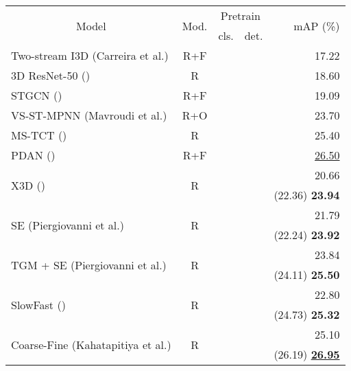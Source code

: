 \documentclass[letterpaper]{article} \usepackage{aaai23}  \usepackage{times}  \usepackage{helvet}  \usepackage{courier}  \usepackage[hyphens]{url}  \usepackage{graphicx} \urlstyle{rm} \def\UrlFont{\rm}  \usepackage{natbib}  \usepackage{caption} \frenchspacing  \setlength{\pdfpagewidth}{8.5in}  \setlength{\pdfpageheight}{11in}  \usepackage{algorithm}
\newcommand{\tablestyle}[2]{\setlength{\tabcolsep}{#1}\renewcommand{\arraystretch}{#2}\centering\footnotesize}
\begin{document}
\begin{table}[t!]
	\centering
	\tablestyle{1.8pt}{1.}
	\fontsize{9}{11}\selectfont
		\begin{tabular}{l|c|c|c|r}
			\multicolumn{1}{c|}{\multirow{2}{*}{Model}} & \multicolumn{1}{c|}{\multirow{2}{*}{Mod.}} & \multicolumn{2}{c|}{Pretrain}  & \multirow{2}{*}{mAP (\%)} \\
			{} & {} & cls. & det. & {} \\
			\shline
			{Two-stream I3D (Carreira et al.)} & {R+F} & \checkmark & {} & 17.22 \\
			3D ResNet-50 (\citeauthor{he2016deep}) & {R} & \checkmark & {} &   18.60 \\
			{STGCN (\citeauthor{ghosh2020stacked})} & {R+F} & \checkmark & {} & 19.09 \\
			{VS-ST-MPNN (Mavroudi et al.)} & {R+O} & \checkmark & {} & 23.70 \\
			{MS-TCT (\citeauthor{dai2022mstct})} & {R} & \checkmark & {} & 25.40 \\
			{PDAN (\citeauthor{dai2021pdan})} & {R+F} & \checkmark & {} & \underline{26.50} \\
			
			\hline
			\multirow{2}{*}{{X3D (\citeauthor{feichtenhofer2020x3d})}} & \multirow{2}{*}{R} & \checkmark & {} &   20.66 \\
			{} & {} & {} & \checkmark & (22.36) {\textbf{23.94}} \\
			\hline
			\multirow{2}{*}{{SE (Piergiovanni et al.)}} & \multirow{2}{*}{R} & \checkmark & {} & {21.79}  \\
			{} & {} & {} & \checkmark & (22.24) {\textbf{23.92}} \\
			\hline
			\multirow{2}{*}{{TGM + SE (Piergiovanni et al.)}} & \multirow{2}{*}{R} & \checkmark & {} & {23.84}  \\
			{} & {} & {} & \checkmark & (24.11) {\textbf{25.50}} \\
			\hline
			\multirow{2}{*}{SlowFast (\citeauthor{feichtenhofer2019slowfast})} & \multirow{2}{*}{R} & \checkmark & {} & 22.80  \\
			{} & {} & {} & \checkmark & (24.73) {\textbf{25.32}} \\
			\hline
			\multirow{2}{*}{{Coarse-Fine (Kahatapitiya et al.)}} & \multirow{2}{*}{R} & \checkmark & {} & 25.10 \\
			{} & {} & {} & \checkmark & (26.19) {\underline{\textbf{26.95}}} \\
			


\end{tabular}
\end{table}
\end{document}
